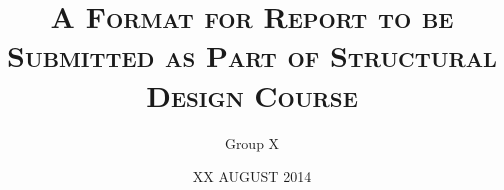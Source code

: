 \documentclass{iitm_course_report}
\begin{document}
\title{\textsc{\MakeUppercase A Format for Report to be Submitted as Part of Structural Design Course}}
\author{Group X}
\date{XX AUGUST 2014}
\maketitle
\cleardoublepage
%

\cleardoublepage
%

\cleardoublepage
\begin{singlespace}
\tableofcontents
\thispagestyle{empty}
\cleardoublepage
\listoftables
{}
\cleardoublepage
\listoffigures
{}
\end{singlespace}
\cleardoublepage

\cleardoublepage
\footskip=0.2in

\cleardoublepage
%
%
\begin{singlespace}


\end{singlespace}
  \renewcommand{\theequation}{A-\arabic{equation}}
  \renewcommand{\thesection}{A.\arabic{section}}
  \renewcommand{\thetable}{A.\arabic{table}}
  \renewcommand{\thefigure}{A.\arabic{figure}}
  \setcounter{equation}{0}  %
\cleardoublepage
\appendix

\end{document}
